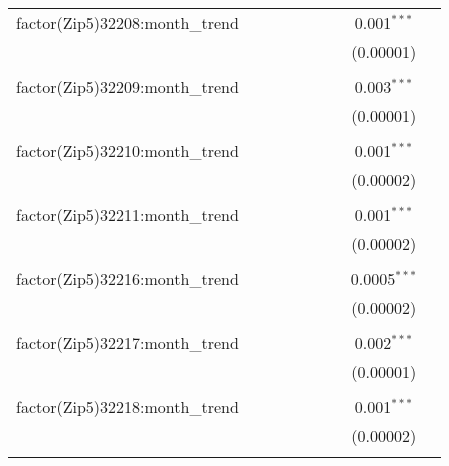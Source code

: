 \begin{table}[H]
{\begin{tabular}{@{\extracolsep{5pt}}lcccccccc}
  factor(Zip5)32208:month\_trend &  &  &  &  &  &  & 0.001$^{***}$ &  \\  

   &  &  &  &  &  &  & (0.00001) &  \\  

   & & & & & & & & \\  

  factor(Zip5)32209:month\_trend &  &  &  &  &  &  & 0.003$^{***}$ &  \\  

   &  &  &  &  &  &  & (0.00001) &  \\  

   & & & & & & & & \\  

  factor(Zip5)32210:month\_trend &  &  &  &  &  &  & 0.001$^{***}$ &  \\  

   &  &  &  &  &  &  & (0.00002) &  \\  

   & & & & & & & & \\  

  factor(Zip5)32211:month\_trend &  &  &  &  &  &  & 0.001$^{***}$ &  \\  

   &  &  &  &  &  &  & (0.00002) &  \\  

   & & & & & & & & \\  

  factor(Zip5)32216:month\_trend &  &  &  &  &  &  & 0.0005$^{***}$ &  \\  

   &  &  &  &  &  &  & (0.00002) &  \\  

   & & & & & & & & \\  

  factor(Zip5)32217:month\_trend &  &  &  &  &  &  & 0.002$^{***}$ &  \\  

   &  &  &  &  &  &  & (0.00001) &  \\  

   & & & & & & & & \\  

  factor(Zip5)32218:month\_trend &  &  &  &  &  &  & 0.001$^{***}$ &  \\  

   &  &  &  &  &  &  & (0.00002) &  \\  

   & & & & & & & & \\  


\end{tabular}}
\end{table}
